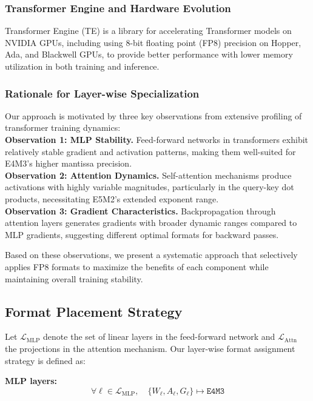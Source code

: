 \documentclass[conference]{IEEEtran}
\begin{document}
\subsubsection{Transformer Engine and Hardware Evolution}
Transformer Engine (TE) is a library for accelerating Transformer models on NVIDIA GPUs, including using 8-bit floating point (FP8) precision on Hopper, Ada, and Blackwell GPUs, to provide better performance with lower memory utilization in both training and inference.

\subsubsection{Rationale for Layer-wise Specialization}
Our approach is motivated by three key observations from extensive profiling of transformer training dynamics:\\
\textbf{Observation 1: MLP Stability.} Feed-forward networks in transformers exhibit relatively stable gradient and activation patterns, making them well-suited for E4M3's higher mantissa precision.\\
\textbf{Observation 2: Attention Dynamics.} Self-attention mechanisms produce activations with highly variable magnitudes, particularly in the query-key dot products, necessitating E5M2's extended exponent range.\\
\textbf{Observation 3: Gradient Characteristics.} Backpropagation through attention layers generates gradients with broader dynamic ranges compared to MLP gradients, suggesting different optimal formats for backward passes.

Based on these observations, we present a systematic approach that selectively applies FP8 formats to maximize the benefits of each component while maintaining overall training stability.

\subsection{Format Placement Strategy}

Let $\mathcal{L}_{\mathrm{MLP}}$ denote the set of linear layers in the feed-forward network and $\mathcal{L}_{\mathrm{Attn}}$ the projections in the attention mechanism. Our layer-wise format assignment strategy is defined as:

\textbf{MLP layers:}
\begin{equation}
\forall \ell \in \mathcal{L}_{\mathrm{MLP}},\quad
\{W_\ell, A_\ell, G_\ell\} \mapsto \texttt{E4M3}
\end{equation}
\end{document}
